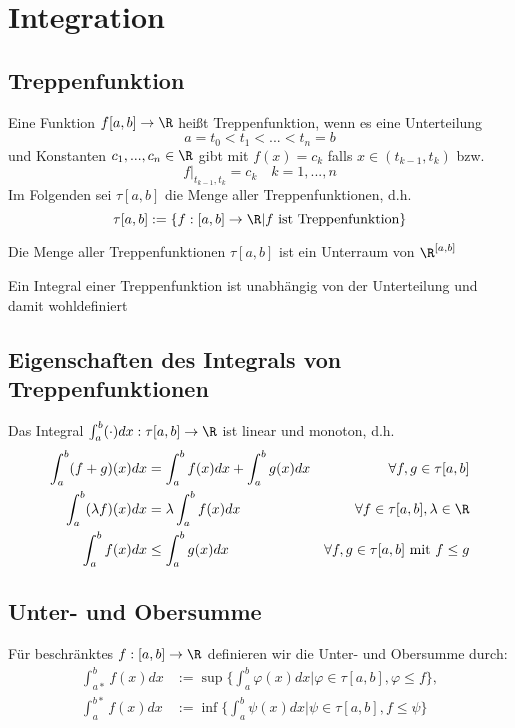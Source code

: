 \section{Integration}
	\subsection{Treppenfunktion}
		\begin{Definition} [ Treppenfunktion]
				Eine Funktion $f[a, b]\to\R$ heißt Treppenfunktion, wenn es eine Unterteilung
				$$
					a=t_0<t_1<...<t_n=b
				$$
				und Konstanten $c_1,...,c_n\in\R$ gibt mit $f(x)=c_k$ falls $x\in(t_{k-1},t_k)$ bzw.
				$$
					f|_{t_{k-1},t_k}=c_k\quad k=1,...,n
				$$
				Im Folgenden sei $\tau[a, b]$ die Menge aller Treppenfunktionen, d.h.
				$$
					\tau[a, b]:=\{f:[a, b]\to\R|f\text{ ist Treppenfunktion}\}
				$$
		\end{Definition}
		\begin{Satz} [ ]
			Die Menge aller Treppenfunktionen $\tau[a, b]$ ist ein Unterraum von $\R^{[a, b]}$
		\end{Satz}
		\begin{Satz} [ ]
			Ein Integral einer Treppenfunktion ist unabhängig von der Unterteilung und damit wohldefiniert
		\end{Satz}
	\subsection{Eigenschaften des Integrals von Treppenfunktionen}
		\begin{Satz} [ ]
			Das Integral $\int_a^b(\cdot)dx:\tau[a, b]\to\R$ ist linear und monoton, d.h.
			\begin{align*}
				\int_a^b(f+g)(x)dx &=\int_a^bf(x)dx+\int_a^bg(x)dx & \forall f, g\in\tau[a, b] \\
				\int_a^b(\lambda f)(x)dx &=\lambda\int_a^bf(x)dx & \forall f\in\tau[a, b],\lambda\in\R \\
				\int_a^bf(x)dx &\leq\int_a^bg(x)dx & \forall f, g\in\tau[a, b] \text{ mit }f\leq g
			\end{align*}
		\end{Satz}
	\subsection{Unter- und Obersumme}
		\begin{Definition} 
			Für beschränktes $f:[a, b]\to\R$ definieren wir die Unter- und Obersumme durch:
			\begin{align*}
				\int_{a*}^bf(x)dx&:=\sup\{\int_a^b\varphi(x)dx|\varphi\in\tau[a, b],\varphi\leq f\},\\
				\int_a^{b*}f(x)dx&:=\inf\{\int_a^b\psi(x)dx|\psi\in\tau[a, b],f \leq\psi\}
			\end{align*}
		\end{Definition}
